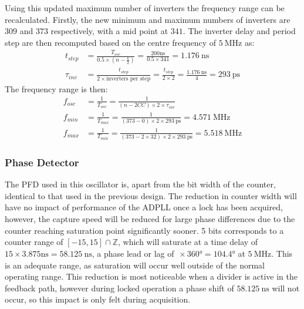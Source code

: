 Using this updated maximum number of inverters the frequency range can be recalculated. Firstly, the new minimum and maximum numbers of inverters are $309$ and $373$ respectively, with a mid point at $341$. The inverter delay and period step are then recomputed based on the centre frequency of $5~\si{\mega\hertz}$ as:
\begin{align}%
t_{step} &= \frac{T_{osc}}{0.5\times(n-\frac{k}{2})} = \frac{200\si{\nano\second}}{0.5\times 341} = 1.176~\si{\nano\second} \\
\tau_{inv} &= \frac{t_{step}}{2\times\text{inverters per step}} = \frac{t_{step}}{2\times2} = \frac{1.176~\si{\nano\second}}{4} = 293~\si{\pico\second}
\end{align}
The frequency range is then:
\begin{align} %
f_{osc} &= \frac{1}{T_{osc}} = \frac{1}{(n-2CC)\times 2\times\tau_{inv}} \\
f_{min} &= \frac{1}{T_{max}} = \frac{1}{(373-0)\times 2\times 293~\si{\pico\second}} = 4.571~\si{\mega\hertz} \\
f_{max} &= \frac{1}{T_{min}} = \frac{1}{(373-2\times32)\times 2\times 293~\si{\pico\second}} = 5.518~\si{\mega\hertz}
\end{align}

\subsubsection{Phase Detector}
The \ac{PFD} used in this oscillator is, apart from the bit width of the counter, identical to that used in the previous design. The reduction in counter width will have no impact of performance of the \ac{ADPLL} once a lock has been acquired, however, the capture speed will be reduced for large phase differences due to the counter reaching saturation point significantly sooner. 5 bits corresponds to a counter range of $[-15,15]\cap\mathbb{Z}$, which will saturate at a time delay of $15\times3.875\si{\nano\second} = 58.125~\si{\nano\second}$, a phase lead or lag of $\frac{}{}\times360\si{\degree} = 104.4\si{\degree}$ at $5~\si{\mega\hertz}$. This is an adequate range, as saturation will occur well outside of the normal operating range. This reduction is most noticeable when a divider is active in the feedback path, however during locked operation a phase shift of $58.125~\si{\nano\second}$ will not occur, so this impact is only felt during acquisition.

